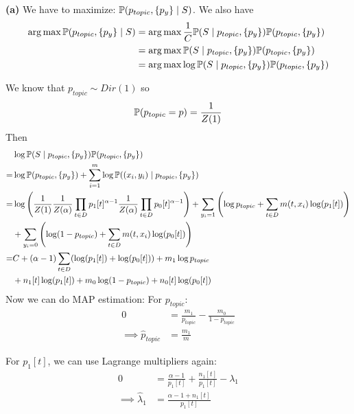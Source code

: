 \documentclass[a4paper, 11pt]{article}
\begin{document}
\begin{problem}
    \textbf{(a)} We have to maximize: $\mathbb{P}(p_{topic}, \{p_y\} \mid S) $. We also have
    \begin{align*}
        \operatorname*{arg\,max} \mathbb{P}(p_{topic}, \{p_y\} \mid S) &= \operatorname*{arg\,max} \frac{1}{C} \mathbb{P}(S \mid p_{topic}, \{p_y\}) \mathbb{P}(p_{topic}, \{p_y\}) \\
        &= \operatorname*{arg\,max} \mathbb{P}(S \mid p_{topic}, \{p_y\}) \mathbb{P}(p_{topic}, \{p_y\}) \\
        &= \operatorname*{arg\,max} \log \mathbb{P}(S \mid p_{topic}, \{p_y\}) \mathbb{P}(p_{topic}, \{p_y\}) 
    \end{align*}

    We know that $p_{topic} \sim Dir(1)$ so \begin{equation*}
        \mathbb{P}(p_{topic} = p) = \frac{1}{Z(1)}
    \end{equation*}
    Then \begin{align*}
        &\log \mathbb{P}(S \mid p_{topic}, \{p_y\}) \mathbb{P}(p_{topic}, \{p_y\})\\
        = &\log \mathbb{P}(p_{topic}, \{p_y\})  + \sum_{i=1}^{m}\log \mathbb{P}((x_i, y_i) \mid p_{topic}, \{p_y\}) \\
        = &\log \left(\frac{1}{Z(1)} \frac{1}{Z(\alpha)} \prod_{t \in D} p_1[t]^{\alpha - 1} \frac{1}{Z(\alpha)} \prod_{t \in D} p_0[t]^{\alpha-1}\right) + \sum_{y_i = 1} \left(\log p_{topic} + \sum_{t \in D} m(t, x_i) \log(p_1[t])\right) \\
        &+ \sum_{y_i = 0} \left(\log (1 -p_{topic}) + \sum_{t \in D} m(t, x_i) \log(p_0[t])\right) \\
        = & C + (\alpha-1)\sum_{t \in D }(\log(p_1[t]) + \log(p_0[t])) + m_1 \log p_{topic} \\
        &+ n_1[t] \log(p_1[t]) + m_0 \log(1 - p_{topic}) + n_0[t] \log(p_0[t]) \\
    \end{align*}
    Now we can do MAP estimation:
    For $p_{topic}$: \begin{align*}
        0 &= \frac{m_1}{p_{topic}} - \frac{m_0}{1 - p_{topic}}  \\
    \implies \hat{p}_{topic} &= \frac{m_1}{m}
    \end{align*}

    For $p_1[t]$, we can use Lagrange multipliers again:
    \begin{align*}
        0 &= \frac{\alpha - 1}{p_1[t]} + \frac{n_1[t]}{p_1[t]} - \lambda_1 \\
        \implies \hat{\lambda}_1 &= \frac{\alpha - 1 + n_1[t]}{p_1[t]}
    \end{align*}


\end{problem}
\end{document}
